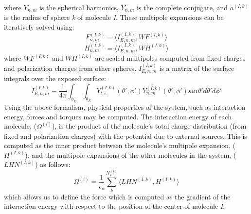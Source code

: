 \documentclass[journal=jpcbfk, manuscript=article]{achemso}
\begin{document}
%
where \(Y_{n,m}\) is the spherical harmonics, $\overline{Y_{n,m}}$ is the complete conjugate, and \(a^{(I,k)}\) is the radius of sphere \textit{k} of molecule \textit{I}. These multipole expansions can be iteratively solved using:
%
\begin{equation}
F_{n,m}^{(I,k)} = \langle I_{E, n,m} ^{(I,k)}, WF^{(I,k)} \rangle
\label{eq:fmat_it}
\end{equation}
%
\begin{equation}
H_{n,m}^{(I,k)} = \langle I_{E, n,m} ^{(I,k)}, WH^{(I,k)} \rangle
\label{eq:hmat_it}
\end{equation}
%
where $WF^{(I,k)}$ and $WH^{(I,k)}$ are scaled multipoles computed from fixed charges and polarization charges from other spheres. \(I_{E,n,m}^{(I,k)}\) is a matrix of the surface integrals over the exposed surface:
%
\begin{equation}
I_{E, n,m} ^{(I,k)} \equiv \frac{1}{4\pi } \int_{\phi_E} \int_{\theta_E} Y_{l,s}^{(I,k)}  (\theta', \phi') \overline{Y_{n,m}^{(I,k)}} (\theta', \phi') sin \theta' d\theta' d \phi' 
\label{eq:imat}
\end{equation}
%
Using the above formalism, physical properties of the system, such as interaction energy, forces and torques may be computed. The interaction energy of each molecule, ($\Omega^{(i)}$), is the product of the molecule's total charge distribution (from fixed and polarization charges) with the potential due to external sources. This is computed as the inner product between the molecule's multipole expansion, ($H^{(I,k)}$), and the multipole expansions of the other molecules in the system, ($LHN^{(I,k)}$) as follows:
%
\begin{equation}
\Omega^{(i)} = \frac{1}{\epsilon_s} \sum_{k}^{N_k^{(I)}}  \langle LHN^{(I,k)}, H^{(I,k)} \rangle
\label{eq:pbsam_en_interact}
\end{equation}
%
which allows us to define the force which is computed as the gradient of the interaction energy with respect to the position of the center of molecule \textit{I}:
\end{document}
